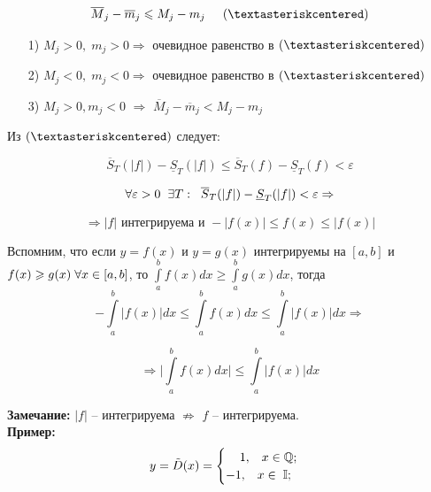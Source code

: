\documentclass[a4paper,12pt]{article} %
\renewcommand {\geq}{\geqslant}
\renewcommand {\leq}{\leqslant}
\begin{document}
     $$ \overline{M}_j - \overline{m}_j \leq M_j - m_j \hspace*{5mm} ( \textasteriskcentered )$$ 
     
     \begin{enumerate}
         \item [1)] $M_j > 0, \; m_j > 0 \Rightarrow$ очевидное равенство в $ (\textasteriskcentered) $
         \item [2)] $M_j < 0, \; m_j < 0  \Rightarrow$ очевидное равенство в $ (\textasteriskcentered) $
         \item [3)] $ M_j > 0, m_j < 0 $ $\Rightarrow$ $ \overline{M}_j - \overline{m}_j < M_j - m_j $
     \end{enumerate}
     
     Из $ (\textasteriskcentered) $ следует:
     
     $$ \overline{S}_T(|f|) -\underline{S}_T(|f|) \leq \overline{S}_T(f) -\underline{S}_T(f) < \varepsilon$$
     
     $$ \forall \varepsilon > 0 \hspace{2 mm} \exists T: \hspace{2 mm} \overline{S}_T(|f|) -\underline{S}_T(|f|) < \varepsilon \Rightarrow $$
     
     $$\Rightarrow |f| \text{ интегрируема и } - |f(x)| \leq f (x) \leq |f (x)| $$
     
     Вспомним, что если $ y = f(x) $ и $ y = g(x) $ интегрируемы на $ [a,b] $ и $ f(x) \geq g(x) \hspace{1 mm} \forall x \in [a, b]$, то $ \int\limits_a^b f(x)dx \geq \int\limits_a^b g(x)dx $, тогда \\ [1 mm]
     $$ - \int\limits_a^b |f(x)| dx \leq \int\limits_a^b f(x) dx \leq \int\limits_a^b |f(x)| dx \Rightarrow $$
     
     $$\Rightarrow \bigg|\int\limits_a^b f(x)dx\bigg| \leq \int\limits_a^b |f(x)|dx $$
     
     \textbf{Замечание:}
     $ |f| $ -- интегрируема $\not\Rightarrow$ $ f $  -- интегрируема.\\
     
     \textbf{Пример:} \\
     \begin{equation*}
    y = \tilde D(x) = \begin{cases}
        \hspace{4 mm}1, \hspace{3 mm} x \in \mathbb{Q};\\
        -1,  \hspace{3 mm} x \in \hspace{1 mm} \mathbb{I};
    \end{cases}
     \end{equation*} \\ [2 mm]
     
\end{document}
